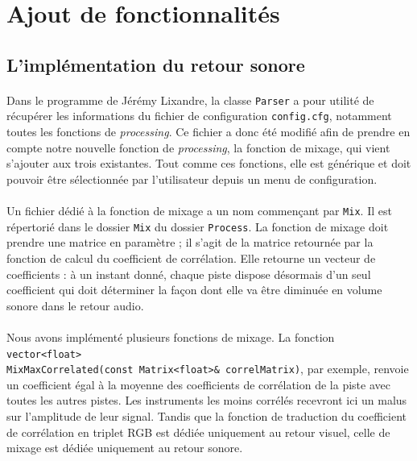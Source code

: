 \section{Ajout de fonctionnalités}

\subsection{L'implémentation du retour sonore}
\paragraph{}
Dans le programme de Jérémy Lixandre, la classe \verb!Parser! a pour
utilité de récupérer les informations du fichier de configuration
\verb!config.cfg!, notamment toutes les fonctions de
\textit{processing}. Ce fichier a donc été modifié afin de prendre en
compte notre nouvelle fonction de \textit{processing}, la fonction de
mixage, qui vient s'ajouter aux trois existantes. Tout comme ces
fonctions, elle est générique et doit pouvoir être sélectionnée par
l'utilisateur depuis un menu de configuration.

\paragraph{}
Un fichier dédié à la fonction de mixage a un nom commençant par
\verb!Mix!. Il est répertorié dans le dossier \verb!Mix! du dossier
\verb!Process!. La fonction de mixage doit prendre une matrice en
paramètre ; il s'agit de la matrice retournée par la fonction de
calcul du coefficient de corrélation. Elle retourne un vecteur de
coefficients : à un instant donné, chaque piste dispose désormais d'un
seul coefficient qui doit déterminer la façon dont elle va être
diminuée en volume sonore dans le retour audio.

\paragraph{}
Nous avons implémenté plusieurs fonctions de mixage. La fonction
\verb!vector<float>!
\\ \verb!MixMaxCorrelated(const Matrix<float>& correlMatrix)!, par
exemple, renvoie un coefficient égal à la moyenne des coefficients de
corrélation de la piste avec toutes les autres pistes. Les instruments
les moins corrélés recevront ici un malus sur l'amplitude de leur signal.
Tandis que la fonction de traduction du coefficient de corrélation en
triplet RGB est dédiée uniquement au retour visuel, celle de mixage est
dédiée uniquement au retour sonore.

